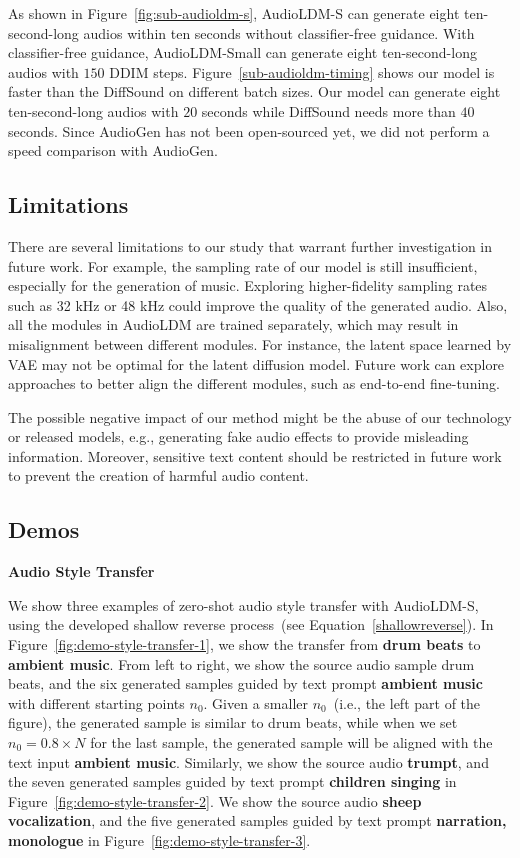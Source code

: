 \documentclass{article}
\begin{document}
As shown in Figure~\ref{fig:sub-audioldm-s}, AudioLDM-S can generate eight ten-second-long audios within ten seconds without classifier-free guidance. With classifier-free guidance, AudioLDM-Small can generate eight ten-second-long audios with $150$ DDIM steps. Figure~\ref{sub-audioldm-timing} shows our model is faster than the DiffSound on different batch sizes. Our model can generate eight ten-second-long audios with $20$ seconds while DiffSound needs more than $40$ seconds. Since AudioGen has not been open-sourced yet, we did not perform a speed comparison with AudioGen.

\subsection{Limitations}

There are several limitations to our study that warrant further investigation in future work. For example, the sampling rate of our model is still insufficient, especially for the generation of music. Exploring higher-fidelity sampling rates such as 32 kHz or 48 kHz could improve the quality of the generated audio. Also, all the modules in AudioLDM are trained separately, which may result in misalignment between different modules. For instance, the latent space learned by VAE may not be optimal for the latent diffusion model. Future work can explore approaches to better align the different modules, such as end-to-end fine-tuning.

The possible negative impact of our method might be the abuse of our technology or released models, e.g., generating fake audio effects to provide misleading information. Moreover, sensitive text content should be restricted in future work to prevent the creation of harmful audio content.

\newpage
\subsection{Demos}
\label{app:demos}

\textbf{Audio Style Transfer}

We show three examples of zero-shot audio style transfer with AudioLDM-S, using the developed shallow reverse process~(see Equation~\ref{shallowreverse}). In Figure~\ref{fig:demo-style-transfer-1}, we show the transfer from \textbf{drum beats} to \textbf{ambient music}. From left to right, we show the source audio sample drum beats, and the six generated samples guided by text prompt \textbf{ambient music} with different starting points $n_{0}$. Given a smaller $n_{0}$~(i.e., the left part of the figure), the generated sample is similar to drum beats, while when we set $n_{0}=0.8\times N$ for the last sample, the generated sample will be aligned with the text input \textbf{ambient music}. Similarly, we show the source audio \textbf{trumpt}, and the seven generated samples guided by text prompt \textbf{children singing} in Figure~\ref{fig:demo-style-transfer-2}. We show the source audio \textbf{sheep vocalization}, and the five generated samples guided by text prompt \textbf{narration, monologue} in Figure~\ref{fig:demo-style-transfer-3}.
\end{document}
